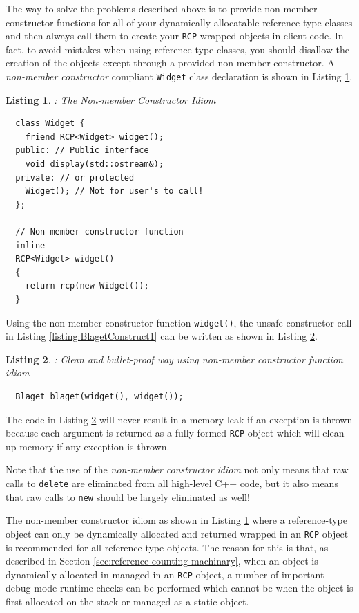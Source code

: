 \documentclass[pdf,ps2pdf,11pt]{SANDreport}
\newtheorem{listing}{Listing}
\begin{document}
The way to solve the problems described above is to provide non-member
constructor functions for all of your dynamically allocatable
reference-type classes and then always call them to create your
{}\texttt{RCP}-wrapped objects in client code.  In fact, to avoid
mistakes when using reference-type classes, you should disallow the
creation of the objects except through a provided non-member
constructor.  A {}\textit{non-member constructor} compliant
{}\texttt{Widget} class declaration is shown in Listing
{}\ref{listing:WidgetNonmemberConstructor}.

\begin{listing}: The Non-member Constructor Idiom\\
\label{listing:WidgetNonmemberConstructor}
{\small\begin{verbatim}
  class Widget {
    friend RCP<Widget> widget();
  public: // Public interface
    void display(std::ostream&);
  private: // or protected
    Widget(); // Not for user's to call!
  };

  // Non-member constructor function
  inline
  RCP<Widget> widget()
  {
    return rcp(new Widget());
  }
\end{verbatim}}
\end{listing}

Using the non-member constructor function {}\texttt{widget()}, the
unsafe constructor call in Listing {}\ref{listing:BlagetConstruct1} can
be written as shown in Listing {}\ref{listing:BlagetConstruct3}.

\begin{listing}: Clean and bullet-proof way using non-member
constructor function idiom \\
\label{listing:BlagetConstruct3}
{\small\begin{verbatim}
  Blaget blaget(widget(), widget());
\end{verbatim}}
\end{listing}

The code in Listing {}\ref{listing:BlagetConstruct3} will never result
in a memory leak if an exception is thrown because each argument is
returned as a fully formed {}\texttt{RCP} object which will clean up
memory if any exception is thrown.

Note that the use of the {}\textit{non-member constructor idiom} not
only means that raw calls to {}\texttt{delete} are eliminated from all
high-level C++ code, but it also means that raw calls to
{}\texttt{new} should be largely eliminated as well!

The non-member constructor idiom as shown in Listing
{}\ref{listing:WidgetNonmemberConstructor} where a reference-type
object can only be dynamically allocated and returned wrapped in an
{}\texttt{RCP} object is recommended for all reference-type objects.
The reason for this is that, as described in Section
{}\ref{sec:reference-counting-machinary}, when an object is
dynamically allocated in managed in an {}\texttt{RCP} object, a number
of important debug-mode runtime checks can be performed which cannot
be when the object is first allocated on the stack or managed as a
static object.
\end{document}
